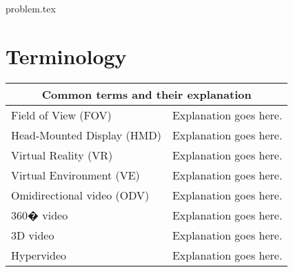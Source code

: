 \documentclass[a4paper,11pt,twoside]{report}
\begin{document}





{problem.tex}






\section{Terminology}

\begin{tabular}{ | p{5.5cm} | p{6.5cm} |  }
	\hline
     	\multicolumn{2}{|c|}{Common terms and their explanation} \\
     	\hline
	Field of View (FOV) & Explanation goes here. \\
    	\hline
     	Head-Mounted Display (HMD) & Explanation goes here. \\
    	\hline
     	Virtual Reality (VR) & Explanation goes here. \\
    	\hline
	Virtual Environment (VE) & Explanation goes here. \\
     	\hline
    	Omidirectional video (ODV) & Explanation goes here. \\
    	\hline
     	360� video & Explanation goes here. \\
     	\hline
     	3D video & Explanation goes here. \\
     	\hline
     	Hypervideo & Explanation goes here. \\
	\hline
\end{tabular}
\end{document}
